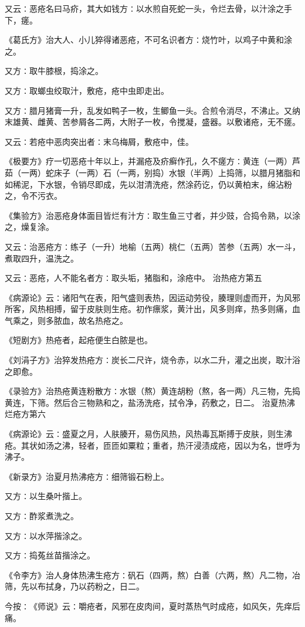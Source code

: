 \documentclass[a4paper,12pt,UTF8,twoside]{ctexbook}
\begin{document}
又云∶恶疮名曰马疥，其大如钱方∶以水煎自死蛇一头，令烂去骨，以汁涂之手下，瘥。

《葛氏方》治大人、小儿猝得诸恶疮，不可名识者方∶烧竹叶，以鸡子中黄和涂之。

又方∶取牛膝根，捣涂之。

又方∶取螂虫绞取汁，敷疮，疮中虫即走出。

又方∶腊月猪膏一升，乱发如鸭子一枚，生鲫鱼一头。合煎令消尽，不沸止。又纳末雄黄、雌黄、苦参屑各二两，大附子一枚，令搅凝，盛器。以敷诸疮，无不瘥。

又云∶若疮中恶肉突出者∶末乌梅屑，敷疮中，佳。

《极要方》疗一切恶疮十年以上，并漏疮及疥癣作孔，久不瘥方∶黄连（一两）芦茹（一两）蛇床子（一两）石（一两，别捣）水银（半两）上捣筛，以腊月猪脂和如稀泥，下水银，令销尽即成，先以泔清洗疮，然涂药讫，仍以黄柏末，绵沾粉之，令不污衣。

《集验方》治恶疮身体面目皆烂有汁方∶取生鱼三寸者，并少豉，合捣令熟，以涂之，燥复涂。

又云∶治恶疮方∶练子（一升）地榆（五两）桃仁（五两）苦参（五两）水一斗，煮取四升，温洗之。

又云∶恶疮，人不能名者方∶取头垢，猪脂和，涂疮中。
治热疮方第五

《病源论》云∶诸阳气在表，阳气盛则表热，因运动劳役，腠理则虚而开，为风邪所客，风热相搏，留于皮肤则生疮。初作瘭浆，黄汁出，风多则痒，热多则痛，血气乘之，则多脓血，故名热疮之。

《短剧方》热疮者，起疮便生白脓是也。

《刘涓子方》治猝发热疮方∶炭长二尺许，烧令赤，以水二升，灌之出炭，取汁浴之即愈。

《录验方》治热疮黄连粉散方∶水银（熬）黄连胡粉（熬，各一两）凡三物，先捣黄连，下筛。然后合三物熟和之，盐汤洗疮，拭令净，药敷之，日二。
治夏热沸烂疮方第六

《病源论》云∶盛夏之月，人肤腠开，易伤风热，风热毒瓦斯搏于皮肤，则生沸疮。其状如汤之沸，轻者，匝匝如粟粒；重者，热汗浸渍成疮，因以为名，世呼为沸子。

《新录方》治夏月热沸疮方∶细筛锻石粉上。

又方∶以生桑叶揩上。

又方∶酢浆煮洗之。

又方∶以水萍揩涂之。

又方∶捣菟丝苗揩涂之。

《令李方》治人身体热沸生疮方∶矾石（四两，熬）白善（六两，熬）凡二物，冶筛，先以布拭身，乃以药粉之，日二。

今按∶《师说》云∶嚼疮者，风邪在皮肉间，夏时蒸热气时成疮，如风矢，先痒后痛。
\end{document}
